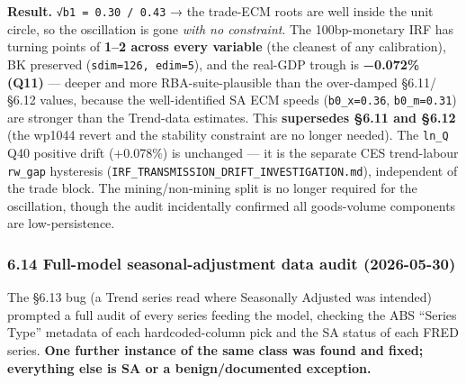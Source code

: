 \documentclass[
]{article}
\begin{document}
\textbf{Result.} \texttt{√b1\ =\ 0.30\ /\ 0.43} → the trade-ECM roots
are well inside the unit circle, so the oscillation is gone \emph{with
no constraint}. The 100bp-monetary IRF has turning points of
\textbf{1--2 across every variable} (the cleanest of any calibration),
BK preserved (\texttt{sdim=126,\ edim=5}), and the real-GDP trough is
\textbf{−0.072\% (Q11)} --- deeper and more RBA-suite-plausible than the
over-damped §6.11/§6.12 values, because the well-identified SA ECM
speeds (\texttt{b0\_x=0.36}, \texttt{b0\_m=0.31}) are stronger than the
Trend-data estimates. This \textbf{supersedes §6.11 and §6.12} (the
wp1044 revert and the stability constraint are no longer needed). The
\texttt{ln\_Q} Q40 positive drift (+0.078\%) is unchanged --- it is the
separate CES trend-labour \texttt{rw\_gap} hysteresis
(\texttt{IRF\_TRANSMISSION\_DRIFT\_INVESTIGATION.md}), independent of
the trade block. The mining/non-mining split is no longer required for
the oscillation, though the audit incidentally confirmed all
goods-volume components are low-persistence.

\subsubsection{6.14 Full-model seasonal-adjustment data audit
(2026-05-30)}\label{full-model-seasonal-adjustment-data-audit-2026-05-30}

The §6.13 bug (a Trend series read where Seasonally Adjusted was
intended) prompted a full audit of every series feeding the model,
checking the ABS ``Series Type'' metadata of each hardcoded-column pick
and the SA status of each FRED series. \textbf{One further instance of
the same class was found and fixed; everything else is SA or a
benign/documented exception.}
\end{document}
